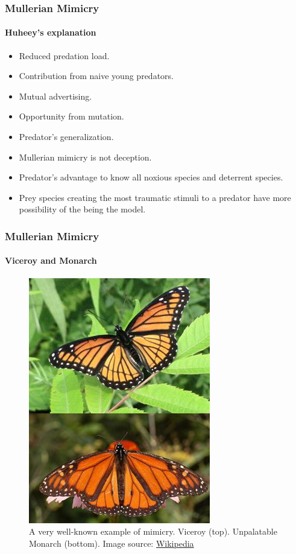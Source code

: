\frame
{
	\frametitle{Mullerian Mimicry}
	\framesubtitle{Huheey's explanation}
	
	\begin{itemize}
		\item Reduced predation load.
		\item Contribution from naive young predators.
		\item Mutual advertising.
		\item Opportunity from mutation.
		\item Predator's generalization.
	\end{itemize}
	
	\begin{itemize}
		\item Mullerian mimicry is not deception.
		\item Predator's advantage to know all noxious species and deterrent species.
		\item Prey species creating the most traumatic stimuli to a predator have more possibility of the being the model.
	\end{itemize}
}

\frame
{
	\frametitle{Mullerian Mimicry}
	\framesubtitle{Viceroy and Monarch}

	\begin{figure}[H]
		\centering
		\includegraphics[scale=0.5]{../tex/images/BatesMimButter}
		\caption{A very well-known example of mimicry. Viceroy (top). Unpalatable Monarch (bottom). Image source: \href{http://en.wikipedia.org/wiki/Mullerian_mimicry}{Wikipedia}}
		\label{fig:mullerian-butterfly}
	\end{figure}

}

